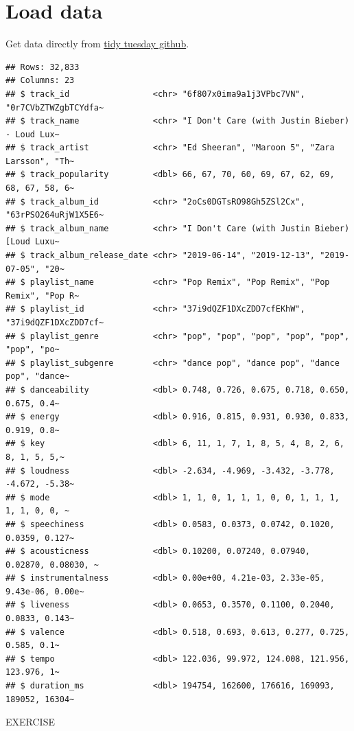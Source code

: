 \documentclass[
]{book}
\begin{document}
\hypertarget{load-data}{%
\section{Load data}\label{load-data}}

Get data directly from \href{https://raw.githubusercontent.com/rfordatascience/tidytuesday/master/data/2020/2020-01-21/spotify_songs.csv}{tidy tuesday github}.

\begin{verbatim}
## Rows: 32,833
## Columns: 23
## $ track_id                 <chr> "6f807x0ima9a1j3VPbc7VN", "0r7CVbZTWZgbTCYdfa~
## $ track_name               <chr> "I Don't Care (with Justin Bieber) - Loud Lux~
## $ track_artist             <chr> "Ed Sheeran", "Maroon 5", "Zara Larsson", "Th~
## $ track_popularity         <dbl> 66, 67, 70, 60, 69, 67, 62, 69, 68, 67, 58, 6~
## $ track_album_id           <chr> "2oCs0DGTsRO98Gh5ZSl2Cx", "63rPSO264uRjW1X5E6~
## $ track_album_name         <chr> "I Don't Care (with Justin Bieber) [Loud Luxu~
## $ track_album_release_date <chr> "2019-06-14", "2019-12-13", "2019-07-05", "20~
## $ playlist_name            <chr> "Pop Remix", "Pop Remix", "Pop Remix", "Pop R~
## $ playlist_id              <chr> "37i9dQZF1DXcZDD7cfEKhW", "37i9dQZF1DXcZDD7cf~
## $ playlist_genre           <chr> "pop", "pop", "pop", "pop", "pop", "pop", "po~
## $ playlist_subgenre        <chr> "dance pop", "dance pop", "dance pop", "dance~
## $ danceability             <dbl> 0.748, 0.726, 0.675, 0.718, 0.650, 0.675, 0.4~
## $ energy                   <dbl> 0.916, 0.815, 0.931, 0.930, 0.833, 0.919, 0.8~
## $ key                      <dbl> 6, 11, 1, 7, 1, 8, 5, 4, 8, 2, 6, 8, 1, 5, 5,~
## $ loudness                 <dbl> -2.634, -4.969, -3.432, -3.778, -4.672, -5.38~
## $ mode                     <dbl> 1, 1, 0, 1, 1, 1, 0, 0, 1, 1, 1, 1, 1, 0, 0, ~
## $ speechiness              <dbl> 0.0583, 0.0373, 0.0742, 0.1020, 0.0359, 0.127~
## $ acousticness             <dbl> 0.10200, 0.07240, 0.07940, 0.02870, 0.08030, ~
## $ instrumentalness         <dbl> 0.00e+00, 4.21e-03, 2.33e-05, 9.43e-06, 0.00e~
## $ liveness                 <dbl> 0.0653, 0.3570, 0.1100, 0.2040, 0.0833, 0.143~
## $ valence                  <dbl> 0.518, 0.693, 0.613, 0.277, 0.725, 0.585, 0.1~
## $ tempo                    <dbl> 122.036, 99.972, 124.008, 121.956, 123.976, 1~
## $ duration_ms              <dbl> 194754, 162600, 176616, 169093, 189052, 16304~
\end{verbatim}

EXERCISE
\end{document}

